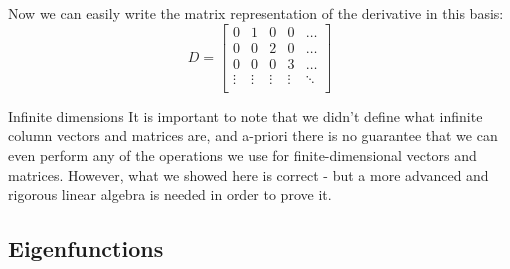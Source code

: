 Now we can easily write the matrix representation of the derivative in this basis:
\begin{equation}
	D =
	\begin{bmatrix}
		0 & 1 & 0 & 0 & \dots\\
		0 & 0 & 2 & 0 & \dots\\
		0 & 0 & 0 & 3 & \dots\\
		\vdots & \vdots & \vdots & \vdots & \ddots\\
	\end{bmatrix}
	\label{eq:derivative_matrix}
\end{equation}

\begin{note}{Infinite dimensions}{}
It is important to note that we didn't define what infinite column vectors and matrices are, and a-priori there is no guarantee that we can even perform any of the operations we use for finite-dimensional vectors and matrices. However, what we showed here is correct - but a more advanced and rigorous linear algebra is needed in order to prove it.
\end{note}

\subsection{Eigenfunctions}
